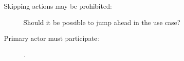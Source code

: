\begin{description}
  \item[Skipping actions may be prohibited:] Should it be possible to jump ahead in the use case?
  \item[Primary actor must participate:] .
\end{description}














